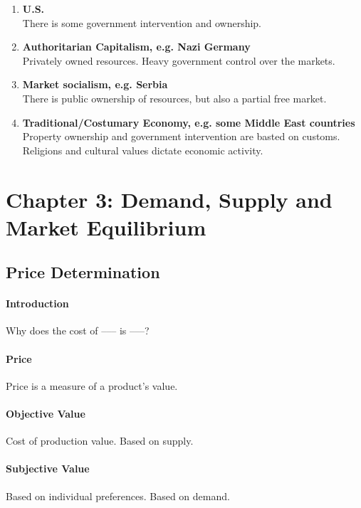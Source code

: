 \begin{enumerate}[label = \textbullet]
	\item \textbf{U.S.}\\There is some government intervention and ownership.\\[-1ex]

	\item \textbf{Authoritarian Capitalism, e.g. Nazi Germany} \\ Privately owned resources. Heavy government control over the markets.\\[-1ex]

	\item \textbf{Market socialism, e.g. Serbia} \\ There is public ownership of resources, but also a partial free market.\\[-1ex]

	\item \textbf{Traditional/Costumary Economy, e.g. some Middle East countries} \\ Property ownership and government intervention are basted on customs. Religions and cultural values dictate economic activity.
\end{enumerate}

\newpage
\section{Chapter 3: Demand, Supply and Market Equilibrium}

\subsection{Price Determination}

\paragraph{Introduction} Why does the cost of ––– is –––?

\paragraph{Price} Price is a measure of a product's value.

\paragraph{Objective Value} Cost of production value. Based on supply.

\paragraph{Subjective Value} Based on individual preferences. Based on demand.

